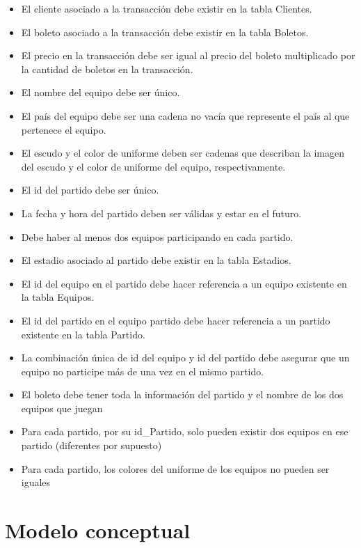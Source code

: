 \begin{itemize}
    \item El cliente asociado a la transacción debe existir en la tabla Clientes.
    \item El boleto asociado a la transacción debe existir en la tabla Boletos.
    \item El precio en la transacción debe ser igual al precio del boleto multiplicado por la cantidad de boletos en la transacción.
    \item El nombre del equipo debe ser único.
    \item El país del equipo debe ser una cadena no vacía que represente el país al que pertenece el equipo.
    \item El escudo y el color de uniforme deben ser cadenas que describan la imagen del escudo y el color de uniforme del equipo, respectivamente.
    \item El id del partido debe ser único.
    \item La fecha y hora del partido deben ser válidas y estar en el futuro.
    \item Debe haber al menos dos equipos participando en cada partido.
    \item El estadio asociado al partido debe existir en la tabla Estadios.
    \item El id del equipo en el partido debe hacer referencia a un equipo existente en la tabla Equipos.
    \item El id del partido en el equipo partido debe hacer referencia a un partido existente en la tabla Partido.
    \item La combinación única de id del equipo y id del partido debe asegurar que un equipo no participe más de una vez en el mismo partido.
    \item El boleto debe tener toda la información del partido y el nombre de los dos equipos que juegan
    \item Para cada partido, por su id_Partido, solo pueden existir dos equipos en ese partido (diferentes por supuesto)
    \item Para cada partido, los colores del uniforme de los equipos no pueden ser iguales 
\end{itemize}


\section{Modelo conceptual}


